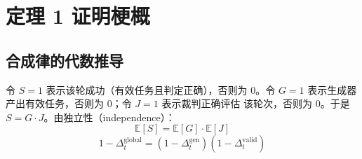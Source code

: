 \section{定理 1 证明梗概}

\subsection*{合成律的代数推导}


令 $S = 1$ 表示该轮成功（有效任务且判定正确），否则为 $0$。令 $G = 1$
表示生成器产出有效任务，否则为 $0$；令 $J = 1$ 表示裁判正确评估
该轮次，否则为 $0$。于是 $S = G \cdot J$。由独立性（independence）：
\[
  \mathbb{E}[S] = \mathbb{E}[G] \cdot \mathbb{E}[J]
\]
\[
  1 - \Delta_t^{\mathrm{global}} = (1 - \Delta_t^{\mathrm{gen}})(1 - \Delta_t^{\mathrm{valid}})
\]


